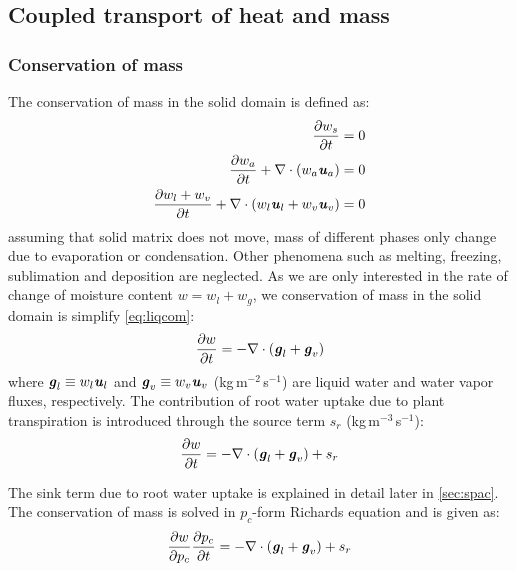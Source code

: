 \subsection{Coupled transport of heat and mass}

\subsubsection*{Conservation of mass}
The conservation of mass in the solid domain is defined as:
\begin{align}
\frac{\partial w_s}{\partial t} &= 0 \label{eq:solidcom} \\ 
\frac{\partial w_a}{\partial t} + \nabla \cdot \left(w_a\textbf{\textit{u}}_a \right) &= 0 \label{eq:aircom} \\ 
\frac{\partial w_l + w_v}{\partial t} + \nabla \cdot \left(w_l\textbf{\textit{u}}_l + w_v\textbf{\textit{u}}_v \right) &= 0 \label{eq:liqcom}
\end{align}
assuming that solid matrix does not move, mass of different phases only change due to evaporation or condensation. Other phenomena such as melting, freezing, sublimation and deposition are neglected. As we are only interested in the rate of change of moisture content $w = w_l + w_g$, we conservation of mass in the solid domain is simplify \cref{eq:liqcom}:
\begin{equation}
 \frac{\partial w}{\partial t} = - \nabla \cdot \left(\textbf{\textit{g}}_l + \textbf{\textit{g}}_v \right)
\end{equation}
where $\textbf{\textit{g}}_l \equiv w_l\textbf{\textit{u}}_l$ and $\textbf{\textit{g}}_v \equiv w_v\textbf{\textit{u}}_v$ (kg\,m$^{-2}$\,s$^{-1}$) are liquid water and water vapor fluxes, respectively. The contribution of root water uptake due to plant transpiration is introduced through the source term $s_r$ (kg\,m$^{-3}$\,s$^{-1}$):
\begin{equation}
\frac{\partial w}{\partial t} = - \nabla \cdot \left(\textbf{\textit{g}}_l + \textbf{\textit{g}}_v \right) + s_r
\end{equation}

The sink term due to root water uptake is explained in detail later in \cref{sec:spac}. The conservation of mass is solved in $p_c$-form Richards equation and is given as:
\begin{equation}
\frac{\partial w}{\partial p_c} \frac{\partial p_c}{\partial t} = -  \nabla \cdot \left(\textbf{\textit{g}}_l + \textbf{\textit{g}}_v\right) + s_{r}
\end{equation}

